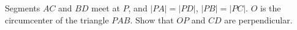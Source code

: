 Segments $AC$ and $BD$ meet at $P$, and $|PA| = |PD|$, $|PB| = |PC|$. $O$ is the circumcenter of the triangle $PAB$. Show that $OP$ and $CD$ are perpendicular.